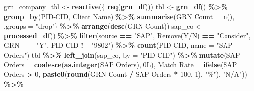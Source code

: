 \documentclass[
]{article}
\newenvironment{Shaded}{\begin{snugshade}}{\end{snugshade}}
\newcommand{\AttributeTok}[1]{\textcolor[rgb]{0.13,0.29,0.53}{#1}}
\newcommand{\DecValTok}[1]{\textcolor[rgb]{0.00,0.00,0.81}{#1}}
\newcommand{\FunctionTok}[1]{\textcolor[rgb]{0.13,0.29,0.53}{\textbf{#1}}}
\newcommand{\NormalTok}[1]{#1}
\newcommand{\OtherTok}[1]{\textcolor[rgb]{0.56,0.35,0.01}{#1}}
\newcommand{\SpecialCharTok}[1]{\textcolor[rgb]{0.81,0.36,0.00}{\textbf{#1}}}
\newcommand{\StringTok}[1]{\textcolor[rgb]{0.31,0.60,0.02}{#1}}
\begin{document}
\begin{Shaded}
\begin{Highlighting}[]
\NormalTok{    grn\_company\_tbl }\OtherTok{\textless{}{-}} \FunctionTok{reactive}\NormalTok{(\{}
      \FunctionTok{req}\NormalTok{(}\FunctionTok{grn\_df}\NormalTok{())}
\NormalTok{      tbl }\OtherTok{\textless{}{-}} \FunctionTok{grn\_df}\NormalTok{() }\SpecialCharTok{\%\textgreater{}\%}
        \FunctionTok{group\_by}\NormalTok{(}\StringTok{\textasciigrave{}}\AttributeTok{PID{-}CID}\StringTok{\textasciigrave{}}\NormalTok{, }\StringTok{\textasciigrave{}}\AttributeTok{Client Name}\StringTok{\textasciigrave{}}\NormalTok{) }\SpecialCharTok{\%\textgreater{}\%}
        \FunctionTok{summarise}\NormalTok{(}\StringTok{\textasciigrave{}}\AttributeTok{GRN Count}\StringTok{\textasciigrave{}} \OtherTok{=} \FunctionTok{n}\NormalTok{(), }\AttributeTok{.groups =} \StringTok{"drop"}\NormalTok{) }\SpecialCharTok{\%\textgreater{}\%}
        \FunctionTok{arrange}\NormalTok{(}\FunctionTok{desc}\NormalTok{(}\StringTok{\textasciigrave{}}\AttributeTok{GRN Count}\StringTok{\textasciigrave{}}\NormalTok{))}
\NormalTok{      sap\_co }\OtherTok{\textless{}{-}} \FunctionTok{processed\_df}\NormalTok{() }\SpecialCharTok{\%\textgreater{}\%}
        \FunctionTok{filter}\NormalTok{(source }\SpecialCharTok{==} \StringTok{"SAP"}\NormalTok{, }\StringTok{\textasciigrave{}}\AttributeTok{Remove(Y/N)}\StringTok{\textasciigrave{}} \SpecialCharTok{==} \StringTok{"Consider"}\NormalTok{, GRN }\SpecialCharTok{==} \StringTok{"Y"}\NormalTok{, }\StringTok{\textasciigrave{}}\AttributeTok{PID{-}CID}\StringTok{\textasciigrave{}} \SpecialCharTok{!=} \StringTok{"9802"}\NormalTok{) }\SpecialCharTok{\%\textgreater{}\%}
        \FunctionTok{count}\NormalTok{(}\StringTok{\textasciigrave{}}\AttributeTok{PID{-}CID}\StringTok{\textasciigrave{}}\NormalTok{, }\AttributeTok{name =} \StringTok{"SAP Orders"}\NormalTok{)}
\NormalTok{      tbl }\SpecialCharTok{\%\textgreater{}\%}
        \FunctionTok{left\_join}\NormalTok{(sap\_co, }\AttributeTok{by =} \StringTok{"PID{-}CID"}\NormalTok{) }\SpecialCharTok{\%\textgreater{}\%}
        \FunctionTok{mutate}\NormalTok{(}\StringTok{\textasciigrave{}}\AttributeTok{SAP Orders}\StringTok{\textasciigrave{}} \OtherTok{=} \FunctionTok{coalesce}\NormalTok{(}\FunctionTok{as.integer}\NormalTok{(}\StringTok{\textasciigrave{}}\AttributeTok{SAP Orders}\StringTok{\textasciigrave{}}\NormalTok{), 0L),}
               \StringTok{\textasciigrave{}}\AttributeTok{Match Rate}\StringTok{\textasciigrave{}} \OtherTok{=} \FunctionTok{ifelse}\NormalTok{(}\StringTok{\textasciigrave{}}\AttributeTok{SAP Orders}\StringTok{\textasciigrave{}} \SpecialCharTok{\textgreater{}} \DecValTok{0}\NormalTok{,}
                                     \FunctionTok{paste0}\NormalTok{(}\FunctionTok{round}\NormalTok{(}\StringTok{\textasciigrave{}}\AttributeTok{GRN Count}\StringTok{\textasciigrave{}} \SpecialCharTok{/} \StringTok{\textasciigrave{}}\AttributeTok{SAP Orders}\StringTok{\textasciigrave{}} \SpecialCharTok{*} \DecValTok{100}\NormalTok{, }\DecValTok{1}\NormalTok{), }\StringTok{"\%"}\NormalTok{), }\StringTok{"N/A"}\NormalTok{)) }\SpecialCharTok{\%\textgreater{}\%}

\end{Highlighting}
\end{Shaded}
\end{document}
